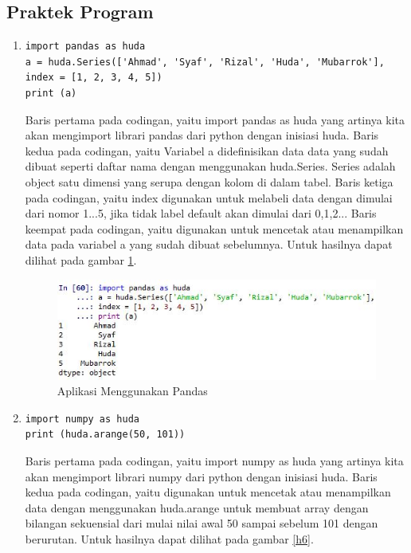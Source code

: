 \subsection{Praktek Program}
\begin{enumerate}
\item 
\begin{verbatim}
import pandas as huda
a = huda.Series(['Ahmad', 'Syaf', 'Rizal', 'Huda', 'Mubarrok'],
index = [1, 2, 3, 4, 5])
print (a)
\end{verbatim}
\subitem Baris pertama pada codingan, yaitu import pandas as huda yang artinya kita akan mengimport librari pandas dari python dengan inisiasi huda.
\subitem Baris kedua pada codingan, yaitu Variabel a didefinisikan data data yang sudah dibuat seperti daftar nama dengan menggunakan huda.Series. Series adalah object satu dimensi yang serupa dengan kolom di dalam tabel.
\subitem Baris ketiga pada codingan, yaitu index digunakan untuk melabeli data dengan dimulai dari nomor 1...5, jika tidak label default akan dimulai dari 0,1,2...
\subitem Baris keempat pada codingan, yaitu digunakan untuk mencetak atau menampilkan data pada variabel a yang sudah dibuat sebelumnya.
\subitem Untuk hasilnya dapat dilihat pada gambar \ref{h5}.
\begin{figure}[!htbp]
	\centerline{\includegraphics[width=1\textwidth]{figures/huda/chapter3_praktek/1.JPG}}
	\caption{Aplikasi Menggunakan Pandas}
	\label{h5}
\end{figure}
\item 
\begin{verbatim}
import numpy as huda
print (huda.arange(50, 101)) 
\end{verbatim}
\subitem Baris pertama pada codingan, yaitu import numpy as huda yang artinya kita akan mengimport librari numpy dari python dengan inisiasi huda.
\subitem Baris kedua pada codingan, yaitu digunakan untuk mencetak atau menampilkan data dengan menggunakan huda.arange untuk membuat array dengan bilangan sekuensial dari mulai nilai awal 50 sampai sebelum 101 dengan berurutan.
\subitem Untuk hasilnya dapat dilihat pada gambar \ref{h6}.
\begin{figure}[!htbp]

\end{figure}
\end{enumerate}
